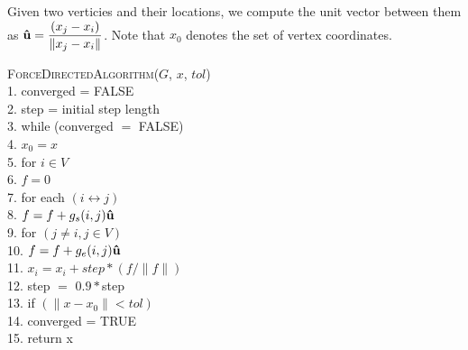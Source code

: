 Given two verticies and their locations, we compute the unit vector between them as $\boldsymbol{\hat{\textbf{u}}} = \dfrac{(x_j-x_i)}{\|x_j-x_i\|}$.
Note that $x_0$ denotes the set of vertex coordinates.
\begin{algorithm}
	\textsc{ForceDirectedAlgorithm}($G$, $x$, $tol$)\\
	1.\hspace{1em} converged = FALSE\\
	2.\hspace{1em} step = initial step length\\
	3.\hspace{1em} while (converged $=$ FALSE) \\
	4.\hspace{2em} $x_0 = x$\\
	5.\hspace{2em} for $i \in V$\\
	6.\hspace{3em} $f = 0$\\
	7.\hspace{3em} for each $(i \leftrightarrow j)$ \\
	8.\hspace{4em} $f = f + g_s(i, j)\boldsymbol{\hat{\textbf{u}}}$\\
	9.\hspace{3em} for $(j \neq i, j \in V)$\\
	10.\hspace{3.5em} $f = f + g_e(i, j)\boldsymbol{\hat{\textbf{u}}}$\\
	11.\hspace{2.5em} $x_i = x_i + step * (f / \| f \|)$\\
	12.\hspace{2.5em} step $=$ $0.9*$step\\
	13.\hspace{2.5em} if $(\|x - x_0\| < tol)$ \\
	14.\hspace{3.5em} converged = TRUE\\
	15.\hspace{1.5em} return x
\end{algorithm}
